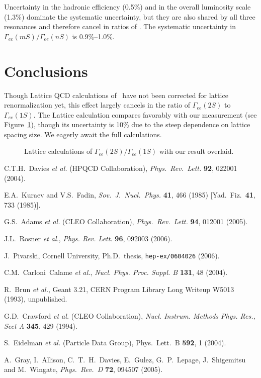 \documentclass{ws-procs9x6}
\begin{document}
Uncertainty in the hadronic efficiency (0.5\%) and in the overall
luminosity scale (1.3\%) dominate the systematic uncertainty, but they
are also shared by all three resonances and therefore cancel in ratios
of \gee.  The systematic uncertainty in
$\Gamma_{ee}(mS)/\Gamma_{ee}(nS)$ is 0.9\%--1.0\%.

\section{Conclusions}

Though Lattice QCD calculations of \gee\ have not been corrected for
lattice renormalization yet\cite{lattice}, this effect largely cancels
in the ratio of $\Gamma_{ee}(2S)$ to $\Gamma_{ee}(1S)$.  The Lattice
calculation compares favorably with our measurement (see
Figure~\ref{lattice}), though its uncertainty is 10\% due to the steep
dependence on lattice spacing size.  We eagerly await the full
calculations.

\begin{figure}
\centerline{\linewidth {}}
\caption{Lattice calculations of $\Gamma_{ee}(2S)/\Gamma_{ee}(1S)$
  with our result overlaid.  \label{lattice}}
\end{figure}

\begin{thebibliography}{0}

C.T.H.~Davies {\it et al.}  (HPQCD Collaboration),
{\it Phys.\ Rev.\ Lett.}  {\bf 92}, 022001 (2004).

E.A.~Kuraev and V.S.~Fadin,
{\it Sov.\ J.\ Nucl.\ Phys.}  {\bf 41}, 466 (1985)
[Yad.\ Fiz.\  {\bf 41}, 733 (1985)].

G.S.~Adams {\it et al.}  (CLEO Collaboration),
{\it Phys.\ Rev.\ Lett.}  {\bf 94}, 012001 (2005).

J.L.~Rosner {\it et al.},
{\it Phys. Rev. Lett.} {\bf 96}, 092003 (2006).

J.~Pivarski, Cornell University, Ph.D.~thesis, {\tt hep-ex/0604026} (2006).

C.M.~Carloni~Calame {\sl et al.},
{\it Nucl. Phys. Proc. Suppl. B} {\bf 131}, 48 (2004).

R.~Brun {\it et al.}, {\textsc Geant} 3.21, CERN Program Library Long
Writeup W5013 (1993), unpublished.

G.D.~Crawford {\it et al.} (CLEO Collaboration),
{\it Nucl. Instrum. Methods Phys. Res., Sect A} {\bf 345}, 429 (1994).

S.~Eidelman {\it et al.}  (Particle Data Group),
Phys.\ Lett.\ B {\bf 592}, 1 (2004).

A.~Gray, I.~Allison, C.~T.~H.~Davies, E.~Gulez, G.~P.~Lepage, J.~Shigemitsu and M.~Wingate,
{\it Phys.\ Rev.\ D} {\bf 72}, 094507 (2005).

\end{thebibliography}
\end{document}
